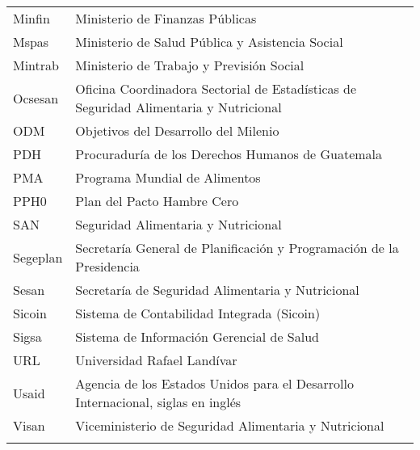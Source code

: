 \begin{center}
\begin{tabular}{p{4.3cm}l}
	Minfin	&	Ministerio de Finanzas Públicas	\\
\rowcolor{color1!5!white}	Mspas	&	Ministerio de Salud Pública y Asistencia Social	\\
	Mintrab	&	Ministerio de Trabajo y Previsión Social	\\
\rowcolor{color1!5!white}	Ocsesan	&	Oficina Coordinadora Sectorial de Estadísticas de Seguridad Alimentaria y Nutricional	\\
	ODM	&	Objetivos del Desarrollo del Milenio	\\
\rowcolor{color1!5!white}	PDH	&	Procuraduría de los Derechos Humanos de Guatemala	\\
	PMA	&	Programa Mundial de Alimentos	\\
\rowcolor{color1!5!white}	PPH0	&	Plan del Pacto Hambre Cero	\\
	SAN	&	Seguridad Alimentaria y Nutricional	\\
\rowcolor{color1!5!white}	Segeplan	&	Secretaría General de Planificación y Programación de la Presidencia	\\
	Sesan	&	Secretaría de Seguridad Alimentaria y Nutricional	\\
\rowcolor{color1!5!white}	Sicoin	&	Sistema de Contabilidad Integrada (Sicoin)	\\
	Sigsa	&	Sistema de Información Gerencial de Salud	\\
\rowcolor{color1!5!white}	URL	&	Universidad Rafael Landívar	\\
	Usaid	&	Agencia de los Estados Unidos para el Desarrollo Internacional, siglas en inglés	\\
\rowcolor{color1!5!white}	Visan	&	Viceministerio de Seguridad Alimentaria y Nutricional	\\
		\hline
		&\\[-0.28cm]
	\end{tabular}
\end{center}
